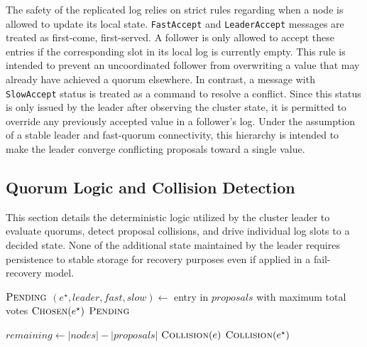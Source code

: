 The safety of the replicated log relies on strict rules regarding when a node is allowed to update its local state. \texttt{FastAccept} and \texttt{LeaderAccept} messages are treated as first-come, first-served. A follower is only allowed to accept these entries if the corresponding slot in its local log is currently empty. This rule is intended to prevent an uncoordinated follower from overwriting a value that may already have achieved a quorum elsewhere. In contrast, a message with \texttt{SlowAccept} status is treated as a command to resolve a conflict. Since this status is only issued by the leader after observing the cluster state, it is permitted to override any previously accepted value in a follower’s log. Under the assumption of a stable leader and fast-quorum connectivity, this hierarchy is intended to make the leader converge conflicting proposals toward a single value.

\subsection{Quorum Logic and Collision Detection}
\label{sect:quorum-logic}
This section details the deterministic logic utilized by the cluster leader to evaluate quorums, detect proposal collisions, and drive individual log slots to a decided state. None of the additional state maintained by the leader requires persistence to stable storage for recovery purposes even if applied in a fail-recovery model.

\begin{algorithm}[t]
\caption{Quorum Evaluation and Collision Resolution}
\label{alg:quorum_eval_collision_resolution}

\begin{algorithmic}[1]
    \State \Return $\textsc{Pending}$
\EndIf
\State $(e^\star, leader, fast, slow) \gets$ entry in $proposals$ with maximum total votes
    \State \Return $\textsc{Chosen}(e^\star)$
\EndIf
{}
    \State \Return $\textsc{Pending}$
\EndIf

\State $remaining \gets |nodes| - |proposals|$
        \State \Return $\textsc{Collision}(e)$
    \EndIf
\EndFor
\State \Return $\textsc{Collision}(e^\star)$
\EndProcedure
\end{algorithmic}
\end{algorithm}

